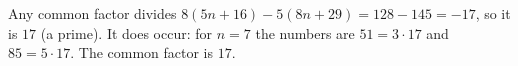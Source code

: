 Any common factor divides $8(5n+16)-5(8n+29)=128-145=-17$, so it is $17$ (a prime). It does occur: for $n=7$ the numbers are $51=3\cdot17$ and $85=5\cdot17$. The common factor is $\boxed{17}$.
